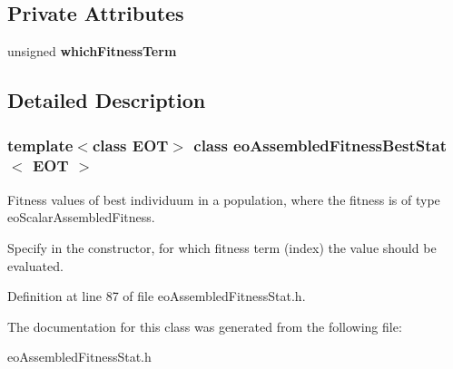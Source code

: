\subsection*{Private Attributes}
\begin{CompactItemize}
\item 
unsigned {\bf which\-Fitness\-Term}\label{classeo_assembled_fitness_best_stat_r0}

\end{CompactItemize}


\subsection{Detailed Description}
\subsubsection*{template$<$class EOT$>$ class eo\-Assembled\-Fitness\-Best\-Stat$<$ EOT $>$}

Fitness values of best individuum in a population, where the fitness is of type eo\-Scalar\-Assembled\-Fitness. 

Specify in the constructor, for which fitness term (index) the value should be evaluated. 



Definition at line 87 of file eo\-Assembled\-Fitness\-Stat.h.

The documentation for this class was generated from the following file:\begin{CompactItemize}
\item 
eo\-Assembled\-Fitness\-Stat.h\end{CompactItemize}
